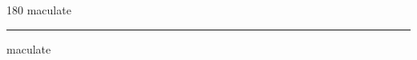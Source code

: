 
\begin{frame}
\begin{center}
\begin{turn}{180}
{\fontsize{2.5cm}{1em}\selectfont maculate}
\end{turn}
\vspace{1em}\par  
\hrule
\vspace{1em}\par  
{\fontsize{2.5cm}{1em}\selectfont maculate}
\end{center}
\end{frame}
